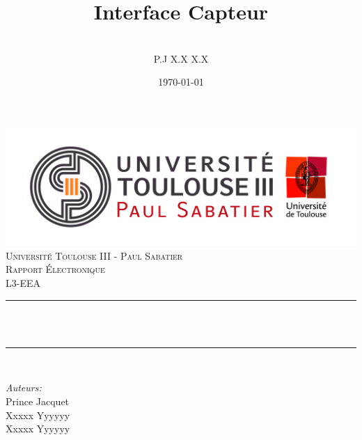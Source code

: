 \documentclass[12pt]{article}
\title{ Interface Capteur }								%
\author{\\P.J X.X X.X}								%
\date{\today}											%
\makeatletter
\let\thetitle\@title
\let\theauthor\@author
\let\thedate\@date
\makeatother
\begin{document}

\begin{titlepage}
	\centering
    \vspace*{0.2 cm}
    \includegraphics[scale = 0.60]{Logo_UT3.jpg}\\[1.0 cm]	%
    \textsc{\LARGE Université Toulouse III - Paul Sabatier}\\[2.0 cm]	%
	\textsc{\Large Rapport Électronique}\\[0.5 cm]				%
	\textsc{\large L3-EEA}\\[0.5 cm]				%
	\rule{\linewidth}{0.2 mm} \\[0.4 cm]
	{ \huge \bfseries \thetitle}\\
	\rule{\linewidth}{0.2 mm} \\[1.5 cm]
	
	\begin{minipage}{0.4\textwidth}
		\large
			\emph{Auteurs:}
			\\Prince Jacquet
			\\Xxxxx Yyyyyy
			\\Xxxxx Yyyyyy
			\end{minipage}~
			\begin{minipage}{0.4\textwidth}
	\end{minipage}\\[2 cm]
	{\large \thedate}\\[2 cm]
	\vfill
\end{titlepage}


\tableofcontents
\pagebreak
\end{document}
